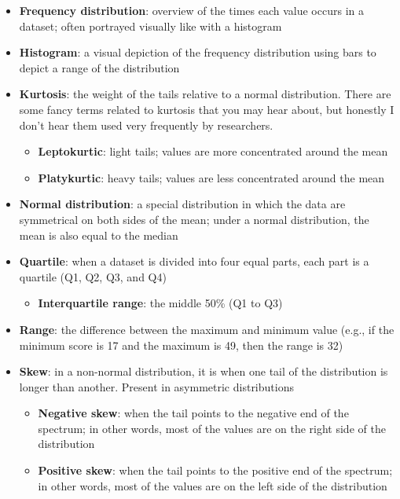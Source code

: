 \documentclass[
]{book}
\providecommand{\tightlist}{%
  \setlength{\itemsep}{0pt}\setlength{\parskip}{0pt}}
\begin{document}
\begin{itemize}
\item
  \textbf{Frequency distribution}: overview of the times each value occurs in a dataset; often portrayed visually like with a histogram
\item
  \textbf{Histogram}: a visual depiction of the frequency distribution using bars to depict a range of the distribution
\item
  \textbf{Kurtosis}: the weight of the tails relative to a normal distribution. There are some fancy terms related to kurtosis that you may hear about, but honestly I don't hear them used very frequently by researchers.

  \begin{itemize}
  \item
    \textbf{Leptokurtic}: light tails; values are more concentrated around the mean
  \item
    \textbf{Platykurtic}: heavy tails; values are less concentrated around the mean
  \end{itemize}
\item
  \textbf{Normal distribution}: a special distribution in which the data are symmetrical on both sides of the mean; under a normal distribution, the mean is also equal to the median
\item
  \textbf{Quartile}: when a dataset is divided into four equal parts, each part is a quartile (Q1, Q2, Q3, and Q4)

  \begin{itemize}
  \tightlist
  \item
    \textbf{Interquartile range}: the middle 50\% (Q1 to Q3)
  \end{itemize}
\item
  \textbf{Range}: the difference between the maximum and minimum value (e.g., if the minimum score is 17 and the maximum is 49, then the range is 32)
\item
  \textbf{Skew}: in a non-normal distribution, it is when one tail of the distribution is longer than another. Present in asymmetric distributions

  \begin{itemize}
  \item
    \textbf{Negative skew}: when the tail points to the negative end of the spectrum; in other words, most of the values are on the right side of the distribution
  \item
    \textbf{Positive skew}: when the tail points to the positive end of the spectrum; in other words, most of the values are on the left side of the distribution
  \end{itemize}
\end{itemize}
\end{document}
